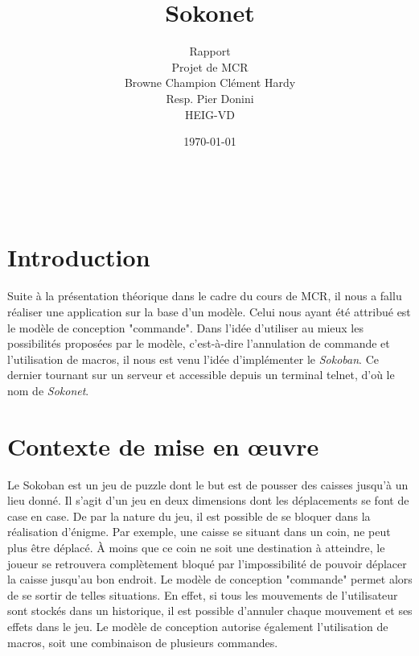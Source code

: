 \documentclass[french]{article}
\begin{document}
	
	\title{Sokonet}
	\author{Rapport\\ 
		Projet de MCR\\
		Browne Champion Clément Hardy\\
		Resp. Pier Donini\\
		HEIG-VD}
	\date{\today} %
	\maketitle
	\thispagestyle{empty}
	
	\newpage
	\thispagestyle{empty}
	$ $
	\newpage
	
	\justify
	\normalsize
	
	
	\section{Introduction}
	Suite à la présentation théorique dans le cadre du cours de MCR, il nous a fallu réaliser une application sur la base d'un modèle. Celui nous ayant été attribué est le modèle de conception "commande". Dans l'idée d'utiliser au mieux les possibilités proposées par le modèle, c'est-à-dire l'annulation de commande et l'utilisation de macros, il nous est venu l'idée d'implémenter le \textit{Sokoban}. Ce dernier tournant sur un serveur et accessible depuis un terminal telnet, d'où le nom de \textit{Sokonet}.
		
	\section{Contexte de mise en œuvre}
	Le Sokoban est un jeu de puzzle dont le but est de pousser des caisses jusqu'à un lieu donné. Il s'agit d'un jeu en deux dimensions dont les déplacements se font de case en case. De par la nature du jeu, il est possible de se bloquer dans la réalisation d'énigme. Par exemple, une caisse se situant dans un coin, ne peut plus être déplacé. À moins que ce coin ne soit une destination à atteindre, le joueur se retrouvera complètement bloqué par l'impossibilité de pouvoir déplacer la caisse jusqu'au bon endroit. Le modèle de conception "commande" permet alors de se sortir de telles situations. En effet, si tous les mouvements de l'utilisateur sont stockés dans un historique, il est possible d'annuler chaque mouvement et ses effets dans le jeu. Le modèle de conception autorise également l'utilisation de macros, soit une combinaison de plusieurs commandes.
	
\end{document}
